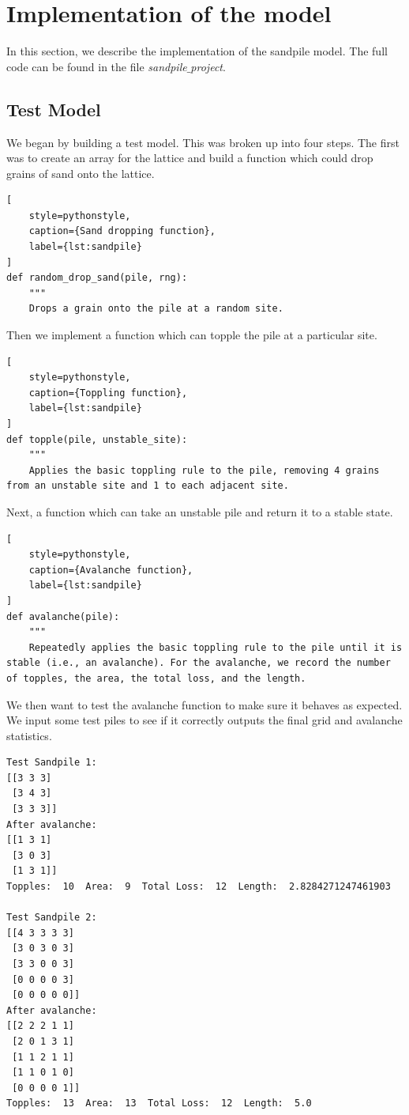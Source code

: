 \chapter{Implementation of the model}

In this section, we describe the implementation of the sandpile model. The full code can be found in the file \emph{sandpile$\_$project}.


\section{Test Model}

We began by building a test model. This was broken up into four steps. The first was to create an array for the lattice and build a function which could drop grains of sand onto the lattice.

\begin{lstlisting}[
    style=pythonstyle,
    caption={Sand dropping function},
    label={lst:sandpile}
]
def random_drop_sand(pile, rng):
    """
    Drops a grain onto the pile at a random site.
\end{lstlisting}

Then we implement a function which can topple the pile at a particular site.

\begin{lstlisting}[
    style=pythonstyle,
    caption={Toppling function},
    label={lst:sandpile}
]
def topple(pile, unstable_site):
    """
    Applies the basic toppling rule to the pile, removing 4 grains from an unstable site and 1 to each adjacent site.
\end{lstlisting}

Next, a function which can take an unstable pile and return it to a stable state.

\begin{lstlisting}[
    style=pythonstyle,
    caption={Avalanche function},
    label={lst:sandpile}
]
def avalanche(pile):
    """
    Repeatedly applies the basic toppling rule to the pile until it is stable (i.e., an avalanche). For the avalanche, we record the number of topples, the area, the total loss, and the length.
\end{lstlisting}


We then want to test the avalanche function to make sure it behaves as expected. We input some test piles to see if it correctly outputs the final grid and avalanche statistics.

\begin{verbatim}
Test Sandpile 1:
[[3 3 3]
 [3 4 3]
 [3 3 3]]
After avalanche:
[[1 3 1]
 [3 0 3]
 [1 3 1]]
Topples:  10  Area:  9  Total Loss:  12  Length:  2.8284271247461903

Test Sandpile 2:
[[4 3 3 3 3]
 [3 0 3 0 3]
 [3 3 0 0 3]
 [0 0 0 0 3]
 [0 0 0 0 0]]
After avalanche:
[[2 2 2 1 1]
 [2 0 1 3 1]
 [1 1 2 1 1]
 [1 1 0 1 0]
 [0 0 0 0 1]]
Topples:  13  Area:  13  Total Loss:  12  Length:  5.0
\end{verbatim}


